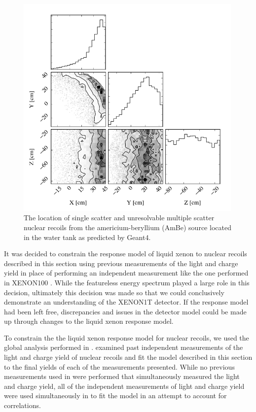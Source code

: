 \begin{figure}[t]
        \centering
	\includegraphics[width=0.99\textwidth]{xe1t_nr_positions}
	\caption{The location of single scatter and unresolvable multiple scatter nuclear recoils from the americium-beryllium (AmBe) source located in the water tank as predicted by Geant4.}
	\label{fig:xe1t_nr_positions}
\end{figure}


It was decided to constrain the response model of liquid xenon to nuclear recoils described in this section using previous measurements of the light and charge yield in place of performing an independent measurement like the one performed in XENON100 \cite{aprile2013response}.  While the featureless energy spectrum played a large role in this decision, ultimately this decision was made so that we could conclusively demonstrate an understanding of the XENON1T detector.  If the response model had been left free, discrepancies and issues in the detector model could be made up through changes to the liquid xenon response model.  

To constrain the the liquid xenon response model for nuclear recoils, we used the global analysis performed in .   examined past independent measurements of the light and charge yield of nuclear recoils and fit the model described in this section to the final yields of each of the measurements presented.  While no previous measurements used in  were performed that simultaneously measured the light and charge yield, all of the independent measurements of light and charge yield were used simultaneously in  to fit the model in an attempt to account for correlations.  

